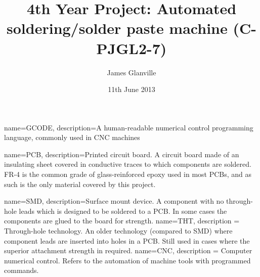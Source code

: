 \usepackage{caption}
\usepackage{subcaption}

\usepackage{biblatex}


\usepackage[xindy,toc]{glossaries}
\makeglossaries

{
	name=GCODE,
	description={A human-readable numerical control programming language, commonly used in CNC machines}
}

{
	name=PCB,
	description={Printed circuit board. A circuit board made of an insulating sheet covered in conductive traces to which components are soldered. FR-4 is the common grade
			of glass-reinforced epoxy used in most PCBs, and as such is the only material covered by this project.}
}

{
	name=SMD,
	description={Surface mount device. A component with no through-hole leads which is designed to be soldered to a PCB. In some cases the components are glued to the board
			for strength.}
}
{
	name=THT,
	description = {Through-hole technology. An older technology (compared to SMD) where component leads are inserted into holes in a PCB. Still used in cases where the superior 
			attachment strength in required.}
}
{
	name=CNC,
	description = {Computer numerical control. Refers to the automation of machine tools with programmed commands.}
}


\usepackage{amsmath}                   %


\usepackage{listings}                  %
\lstset{
  basicstyle = \small
}

\providecommand{\e}[1]{\ensuremath{\times10^{#1}}}
\providecommand{\degrees}{\ensuremath{^{\circ}}}

\title{4th Year Project: Automated soldering/solder paste machine (C-PJGL2-7)} %
\author{James Glanville}
\date{11th June 2013}

\hypersetup{
    colorlinks,
    allcolors=blue,
    linktoc=all,
}



